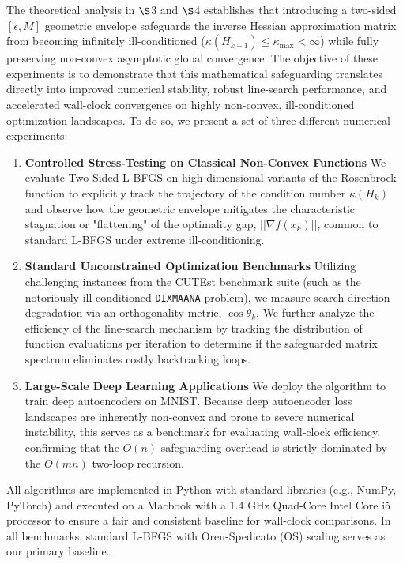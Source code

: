 \documentclass[twoside,11pt]{article}
\begin{document}
The theoretical analysis in $\S$3 and $\S$4 establishes that introducing a two-sided $[\epsilon, M]$ geometric envelope safeguards the inverse Hessian approximation matrix from becoming infinitely ill-conditioned ($\kappa(H_{k+1}) \leq \kappa_{\max} < \infty$) while fully preserving non-convex asymptotic global convergence. The objective of these experiments is to demonstrate that this mathematical safeguarding translates directly into improved numerical stability, robust line-search performance, and accelerated wall-clock convergence on highly non-convex, ill-conditioned optimization landscapes. To do so, we present a set of three different numerical experiments:
\begin{enumerate}
    \item \textbf{Controlled Stress-Testing on Classical Non-Convex Functions} We evaluate Two-Sided L-BFGS on high-dimensional variants of the Rosenbrock function to explicitly track the trajectory of the condition number $\kappa(H_k)$ and observe how the geometric envelope mitigates the characteristic stagnation or "flattening" of the optimality gap, $|| \nabla f(x_k) ||$, common to standard L-BFGS under extreme ill-conditioning.
    \item \textbf{Standard Unconstrained Optimization Benchmarks} Utilizing challenging instances from the CUTEst benchmark suite (such as the notoriously ill-conditioned \texttt{DIXMAANA} problem), we measure search-direction degradation via an orthogonality metric, $\cos\theta_k$. We further analyze the efficiency of the line-search mechanism by tracking the distribution of function evaluations per iteration to determine if the safeguarded matrix spectrum eliminates costly backtracking loops.
    \item \textbf{Large-Scale Deep Learning Applications} We deploy the algorithm to train deep autoencoders on MNIST. Because deep autoencoder loss landscapes are inherently non-convex and prone to severe numerical instability, this serves as a benchmark for evaluating wall-clock efficiency, confirming that the $O(n)$ safeguarding overhead is strictly dominated by the $O(mn)$ two-loop recursion.
\end{enumerate}

\noindent
All algorithms are implemented in Python with standard libraries (e.g., NumPy, PyTorch) and executed on a Macbook with a 1.4 GHz Quad-Core Intel Core i5 processor to ensure a fair and consistent baseline for wall-clock comparisons. In all benchmarks, standard L-BFGS with Oren-Spedicato (OS) scaling serves as our primary baseline.
\end{document}

